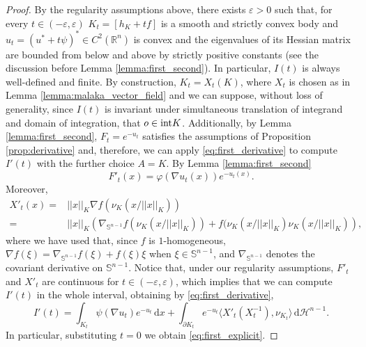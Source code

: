 \documentclass[a4paper, 11pt]{article}
\newcommand{\R}{\mathbb{R}}
\newcommand{\sph}{\mathbb{S}}
\newcommand{\haus}{\mathcal{H}}
\theoremstyle{definition}
\newcommand{\di}{\, \mathrm{d}}
\begin{document}
\begin{proof}
       By the regularity assumptions above, there exists $\varepsilon>0$ such that, for every $t \in (-\varepsilon,\varepsilon)$ $K_t=[h_K+tf]$ is a smooth and strictly convex body and $u_t=(u^*+t\psi)^* \in C^2(\R^n)$ is convex and the eigenvalues of its Hessian matrix are bounded from below and above by strictly positive constants (see the discussion before Lemma \ref{lemma:first_second}). In particular, $I(t)$ is always well-defined and finite. By construction, $K_t=X_t(K)$, where $X_t$ is chosen as in Lemma \ref{lemma:malaka_vector_field} and we can suppose, without loss of generality, since $I(t)$ is invariant under simultaneous translation of integrand and domain of integration, that $o \in {\rm int}K$. Additionally, by Lemma \ref{lemma:first_second}, $F_t=e^{-{u_t}}$ satisfies the assumptions of Proposition \ref{prop:derivative} and, therefore, we can apply \eqref{eq:first_derivative} to compute $I'(t)$ with the further choice $A=K$. By Lemma \ref{lemma:first_second} \[ F'_t(x)=\varphi(\nabla u_t(x))e^{-u_t(x)}.\] Moreover,
       \begin{align*}
           X'_t(x)= &||x||_K\nabla f(\nu_K(x/||x||_K))\\ =&||x||_K\left( \nabla_{\sph^{n-1}} f(\nu_K(x/||x||_K))+f(\nu_K(x/||x||_K)\nu_K(x/||x||_K) \right),
       \end{align*}
       where we have used that, since $f$ is $1$-homogeneous, $\nabla f (\xi)=\nabla_{\sph^{n-1}}f(\xi)+f(\xi)\xi$ when $\xi \in \sph^{n-1}$, and $\nabla_{\sph^{n-1}}$ denotes the covariant derivative on $\sph^{n-1}$. Notice that, under our regularity assumptions, $F'_t$ and $X'_t$ are continuous for $t \in (-\varepsilon,\varepsilon)$, which implies that we can compute $I'(t)$ in the whole interval, obtaining by \eqref{eq:first_derivative},
    \begin{equation}\label{eq:first_d_explicit}
        I'(t)=\int_{K_t} \psi(\nabla u_t) e^{-u_t} \di x+\int_{\partial K_t} e^{-u_t} \langle X'_t(X^{-1}_t),\nu_{K_t} \rangle \di \haus^{n-1}.
    \end{equation}
    In particular, substituting $t=0$ we obtain \eqref{eq:first_explicit}.


\end{proof}
\end{document}
